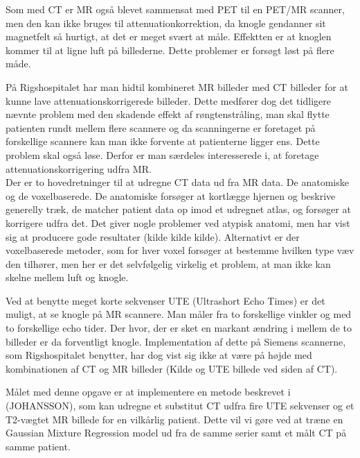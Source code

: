 Som med CT er MR også blevet sammensat med PET til en PET/MR scanner, men den
kan ikke bruges til attenuationkorrektion, da knogle gendanner sit magnetfelt
så hurtigt, at det er meget svært at måle. Effektten er at knoglen kommer
til at ligne luft på billederne. Dette problemer er forsøgt løst på flere måde.

På Rigshospitalet har man hidtil kombineret MR billeder med CT billeder
for at kunne lave attenuationskorrigerede billeder. Dette medfører dog det
tidligere nævnte problem med den skadende effekt af røngtenstråling, man
skal flytte patienten rundt mellem flere scannere og da scanningerne er
foretaget på forskellige scannere kan man ikke forvente at patienterne ligger
ens. Dette problem skal også løse. Derfor er man særdeles interesserede i,
at foretage attenuationskorrigering udfra MR. \\

Der er to hovedretninger til at udregne CT data ud fra MR data. De anatomiske
og de voxelbaserede. De anatomiske forsøger at kortlægge hjernen og beskrive
generelly træk, de matcher patient data op imod et udregnet atlas, og
forsøger at korrigere udfra det. Det giver nogle problemer ved atypisk
anatomi, men har vist sig at producere gode resultater (kilde kilde kilde).
Alternativt er der voxelbaserede metoder, som for hver voxel forsøger at
bestemme hvilken type væv den tilhører, men her er det selvfølgelig virkelig
et problem, at man ikke kan skelne mellem luft og knogle.

Ved at benytte meget korte sekvenser UTE (Ultrashort Echo Times) er det muligt,
at se knogle på MR scannere. Man måler fra to forskellige vinkler og med to
forskellige echo tider. Der hvor, der er sket en markant ændring i mellem
de to billeder er da forventligt knogle. Implementation af dette på Siemens
scannerne, som Rigshospitalet benytter, har dog vist sig ikke at være på højde
med kombinationen af CT og MR billeder (Kilde og UTE billede ved siden af CT).

Målet med denne opgave er at implementere en metode beskrevet i
(JOHANSSON), som kan udregne et substitut CT udfra fire UTE sekvenser
og et T2-vægtet MR billede for en vilkårlig patient. Dette vil vi gøre ved
at træne en Gaussian Mixture Regression model ud fra de samme serier samt et
målt CT på samme patient. 
